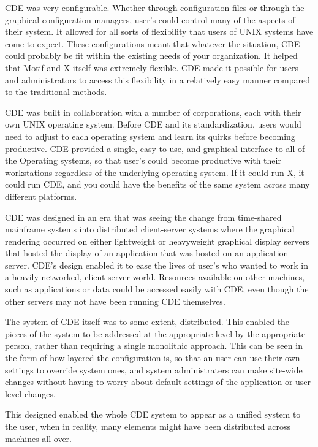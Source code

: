 CDE was very configurable. Whether through configuration files or
through the graphical configuration managers, user's could control many
of the aspects of their system. It allowed for all sorts of flexibility
that users of UNIX systems have come to expect. These configurations
meant that whatever the situation, CDE could probably be fit within the
existing needs of your organization. It helped that Motif and X itself
was extremely flexible. CDE made it possible for users and
administrators to access this flexibility in a relatively easy manner
compared to the traditional methods.

CDE was built in collaboration with a number of corporations, each with
their own UNIX operating system. Before CDE and its standardization,
users would need to adjust to each operating system and learn its quirks
before becoming productive. CDE provided a single, easy to use, and
graphical interface to all of the Operating systems, so that user's
could become productive with their workstations regardless of the
underlying operating system. If it could run X, it could run CDE, and
you could have the benefits of the same system across many different
platforms.

CDE was designed in an era that was seeing the change from time-shared
mainframe systems into distributed client-server systems where the
graphical rendering occurred on either lightweight or heavyweight
graphical display servers that hosted the display of an application that
was hosted on an application server. CDE's design enabled it to ease the
lives of user's who wanted to work in a heavily networked, client-server
world. Resources available on other machines, such as applications or
data could be accessed easily with CDE, even though the other servers
may not have been running CDE themselves. 

The system of CDE itself was to some extent, distributed. This enabled
the pieces of the system to be addressed at the appropriate level by the
appropriate person, rather than requiring a single monolithic approach.
This can be seen in the form of how layered the configuration is, so
that an user can use their own settings to override system ones, and
system administraters can make site-wide changes without having to worry
about default settings of the application or user-level changes. 

This designed enabled the whole CDE system to appear as a unified system
to the user, when in reality, many elements might have been distributed
across machines all over. 

